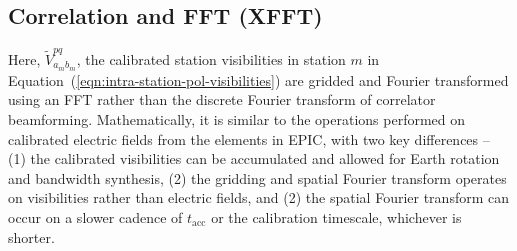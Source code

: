 \documentclass[
  journal=pasa,
  manuscript=article-type,
  year=2020,
  volume=37,
]{cup-journal}
\begin{document}
\subsection{Correlation and FFT (XFFT)}

Here, $\widetilde{V}_{a_m b_m}^{pq}$, the calibrated station visibilities in station $m$ in Equation~(\ref{eqn:intra-station-pol-visibilities}) are gridded and Fourier transformed using an FFT rather than the discrete Fourier transform of correlator beamforming. Mathematically, it is similar to the operations performed on calibrated electric fields from the elements in EPIC, with two key differences -- (1) the calibrated visibilities can be accumulated and allowed for Earth rotation and bandwidth synthesis, (2) the gridding and spatial Fourier transform operates on visibilities rather than electric fields, and (2) the spatial Fourier transform can occur on a slower cadence of $t_\textrm{acc}$ or the calibration timescale, whichever is shorter. 
\end{document}
